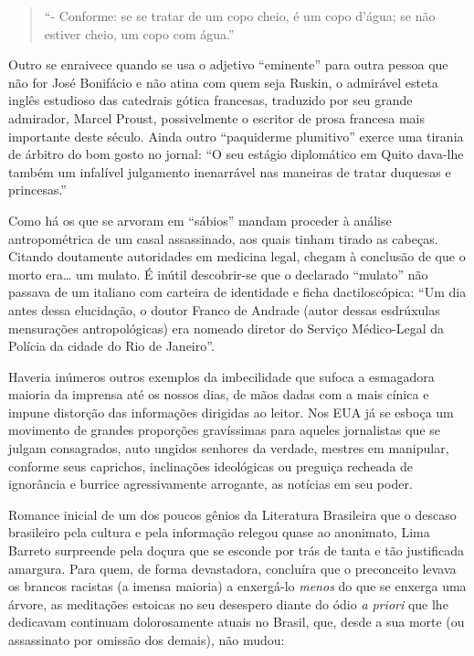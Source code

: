 \documentclass[
  letterpaper,
  DIV=11,
  numbers=noendperiod]{scrreprt}
\begin{document}
\begin{quote}
``- Conforme: se se tratar de um copo cheio, é um copo d'água; se não
estiver cheio, um copo com água.''
\end{quote}

Outro se enraivece quando se usa o adjetivo ``eminente'' para outra
pessoa que não for José Bonifácio e não atina com quem seja Ruskin, o
admirável esteta inglês estudioso das catedrais gótica francesas,
traduzido por seu grande admirador, Marcel Proust, possivelmente o
escritor de prosa francesa mais importante deste século. Ainda outro
``paquiderme plumitivo'' exerce uma tirania de árbitro do bom gosto no
jornal: ``O seu estágio diplomático em Quito dava-lhe também um
infalível julgamento inenarrável nas maneiras de tratar duquesas e
princesas.''

Como há os que se arvoram em ``sábios'' mandam proceder à análise
antropométrica de um casal assassinado, aos quais tinham tirado as
cabeças. Citando doutamente autoridades em medicina legal, chegam à
conclusão de que o morto era\ldots{} um mulato. É inútil descobrir-se
que o declarado ``mulato'' não passava de um italiano com carteira de
identidade e ficha dactiloscópica: ``Um dia antes dessa elucidação, o
doutor Franco de Andrade (autor dessas esdrúxulas mensurações
antropológicas) era nomeado diretor do Serviço Médico-Legal da Polícia
da cidade do Rio de Janeiro''.

Haveria inúmeros outros exemplos da imbecilidade que sufoca a esmagadora
maioria da imprensa até os nossos dias, de mãos dadas com a mais cínica
e impune distorção das informações dirigidas ao leitor. Nos EUA já se
esboça um movimento de grandes proporções gravíssimas para aqueles
jornalistas que se julgam consagrados, auto ungidos senhores da verdade,
mestres em manipular, conforme seus caprichos, inclinações ideológicas
ou preguiça recheada de ignorância e burrice agressivamente arrogante,
as notícias em seu poder.

Romance inicial de um dos poucos gênios da Literatura Brasileira que o
descaso brasileiro pela cultura e pela informação relegou quase ao
anonimato, Lima Barreto surpreende pela doçura que se esconde por trás
de tanta e tão justificada amargura. Para quem, de forma devastadora,
concluíra que o preconceito levava os brancos racistas (a imensa
maioria) a enxergá-lo \emph{menos} do que se enxerga uma árvore, as
meditações estoicas no seu desespero diante do ódio \emph{a priori} que
lhe dedicavam continuam dolorosamente atuais no Brasil, que, desde a sua
morte (ou assassinato por omissão dos demais), não mudou:
\end{document}
